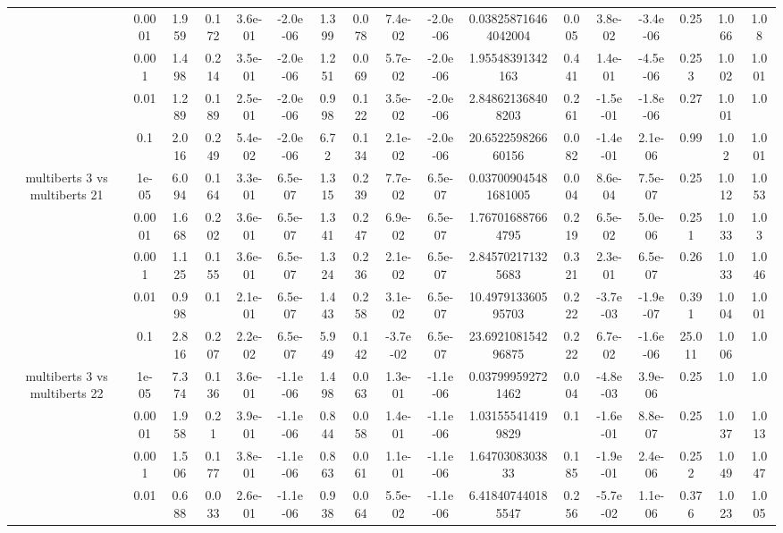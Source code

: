 \begin{tabular}{|c|c|c|c|c|c|c|c|c|c|c|c|c|c|c|c|c|}
 & 0.0001 & 1.959 & 0.172 & 3.6e-01 & -2.0e-06 & 1.399 & 0.078 & 7.4e-02 & -2.0e-06 & 0.038258716464042004 & 0.005 & 3.8e-02 & -3.4e-06 & 0.25 & 1.066 & 1.08 \\
 & 0.001 & 1.498 & 0.214 & 3.5e-01 & -2.0e-06 & 1.251 & 0.069 & 5.7e-02 & -2.0e-06 & 1.95548391342163 & 0.441 & 1.4e-01 & -4.5e-06 & 0.253 & 1.002 & 1.001 \\
 & 0.01 & 1.289 & 0.189 & 2.5e-01 & -2.0e-06 & 0.998 & 0.122 & 3.5e-02 & -2.0e-06 & 2.848621368408203 & 0.261 & -1.5e-01 & -1.8e-06 & 0.27 & 1.001 & 1.0 \\
 & 0.1 & 2.016 & 0.249 & 5.4e-02 & -2.0e-06 & 6.72 & 0.134 & 2.1e-02 & -2.0e-06 & 20.652259826660156 & 0.082 & -1.4e-01 & 2.1e-06 & 0.99 & 1.02 & 1.001 \\
\hline
\multirow{5}{*}{multiberts 3 vs multiberts 21} & 1e-05 & 6.094 & 0.164 & 3.3e-01 & 6.5e-07 & 1.315 & 0.239 & 7.7e-02 & 6.5e-07 & 0.037009045481681005 & 0.004 & 8.6e-04 & 7.5e-07 & 0.25 & 1.012 & 1.053 \\
 & 0.0001 & 1.668 & 0.202 & 3.6e-01 & 6.5e-07 & 1.341 & 0.247 & 6.9e-02 & 6.5e-07 & 1.767016887664795 & 0.219 & 6.5e-02 & 5.0e-06 & 0.251 & 1.033 & 1.03 \\
 & 0.001 & 1.125 & 0.155 & 3.6e-01 & 6.5e-07 & 1.324 & 0.236 & 2.1e-02 & 6.5e-07 & 2.845702171325683 & 0.321 & 2.3e-01 & 6.5e-07 & 0.26 & 1.033 & 1.046 \\
 & 0.01 & 0.998 & 0.1 & 2.1e-01 & 6.5e-07 & 1.443 & 0.258 & 3.1e-02 & 6.5e-07 & 10.497913360595703 & 0.222 & -3.7e-03 & -1.9e-07 & 0.391 & 1.004 & 1.001 \\
 & 0.1 & 2.816 & 0.207 & 2.2e-02 & 6.5e-07 & 5.949 & 0.142 & -3.7e-02 & 6.5e-07 & 23.692108154296875 & 0.222 & 6.7e-02 & -1.6e-06 & 25.011 & 1.006 & 1.0 \\
\hline
\multirow{5}{*}{multiberts 3 vs multiberts 22} & 1e-05 & 7.374 & 0.136 & 3.6e-01 & -1.1e-06 & 1.498 & 0.063 & 1.3e-01 & -1.1e-06 & 0.037999592721462 & 0.004 & -4.8e-03 & 3.9e-06 & 0.25 & 1.0 & 1.0 \\
 & 0.0001 & 1.958 & 0.21 & 3.9e-01 & -1.1e-06 & 0.844 & 0.058 & 1.4e-01 & -1.1e-06 & 1.031555414199829 & 0.1 & -1.6e-01 & 8.8e-07 & 0.25 & 1.037 & 1.013 \\
 & 0.001 & 1.506 & 0.177 & 3.8e-01 & -1.1e-06 & 0.863 & 0.061 & 1.1e-01 & -1.1e-06 & 1.6470308303833 & 0.185 & -1.9e-01 & 2.4e-06 & 0.252 & 1.049 & 1.047 \\
 & 0.01 & 0.688 & 0.033 & 2.6e-01 & -1.1e-06 & 0.938 & 0.064 & 5.5e-02 & -1.1e-06 & 6.418407440185547 & 0.256 & -5.7e-02 & 1.1e-06 & 0.376 & 1.023 & 1.005 \\

\end{tabular}
